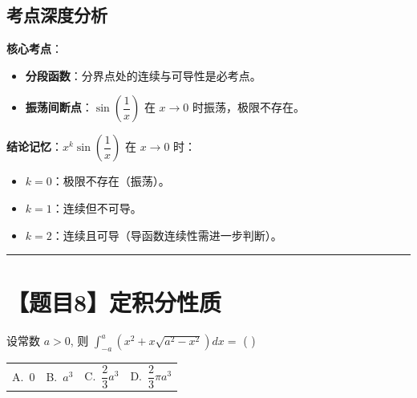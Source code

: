 \documentclass[UTF8,10pt]{ctexart}
\makeatletter
\newenvironment{redenv}{\color{red}}{}
\newenvironment{conceptbox}{%
    \begin{tcolorbox}[colback=red!5, colframe=red!50!black, title=概念解析, fonttitle=\bfseries, top=2pt, bottom=2pt, left=2pt, right=2pt]
}{%
    \end{tcolorbox}
}
\newcommand{\problemrule}{\par\filbreak\noindent\rule{\textwidth}{1.5pt}\vspace{-0.5em}}
\newcommand{\fourchoices}[4]{
    \par\noindent
    \begin{tabular*}{\linewidth}{@{\extracolsep{\fill}}llll}
        A.~#1 & B.~#2 & C.~#3 & D.~#4
    \end{tabular*}
}
\makeatother
\begin{document}
\begin{redenv}
\subsection*{考点深度分析}
\begin{conceptbox}
\textbf{核心考点}：
\begin{itemize}
    \item \textbf{分段函数}：分界点处的连续与可导性是必考点。
    \item \textbf{振荡间断点}：$\sin(\dfrac{1}{x})$ 在 $x \to 0$ 时振荡，极限不存在。
\end{itemize}
\textbf{结论记忆}：$x^k \sin(\dfrac{1}{x})$ 在 $x \to 0$ 时：
\begin{itemize}
    \item $k=0$：极限不存在（振荡）。
    \item $k=1$：连续但不可导。
    \item $k=2$：连续且可导（导函数连续性需进一步判断）。
\end{itemize}
\end{conceptbox}
\end{redenv}

\problemrule
\section*{【题目8】定积分性质}
设常数 $a > 0$, 则 $\int_{-a}^{a} (x^2 + x\sqrt{a^2-x^2})dx = $ ( \quad )
\fourchoices{0}{$a^3$}{$\dfrac{2}{3}a^3$}{$\dfrac{2}{3}\pi a^3$}
\end{document}

